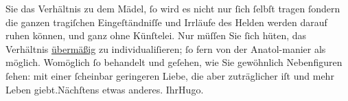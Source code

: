 \begin{ledgroupsized}[t]{13cm}
               Sie das Verhältnis
                    zu dem Mädel, ſo wird es nicht nur ſich ſelbſt tragen ſondern die ganzen
                    tragiſchen Eingeſtändniſſe und Irrläufe des Helden werden darauf ruhen können,
                    und ganz ohne Künſtelei. Nur müſſen Sie ſich hüten, das Verhältnis \uline{übermäßig} zu individualiſieren; ſo fern von der
                        Anatol-manier als möglich.\pend
           \pstart
           Womöglich ſo behandelt und geſehen, wie Sie gewöhnlich Nebenfiguren ſehen: mit
                    einer ſcheinbar geringeren Liebe, die aber zuträglicher iſt und mehr Leben
                        giebt.\hspace*{2.5em}Nächſtens etwas anderes.\pend
           \pstart Ihr\spacefill\mbox{Hugo.}\pend{}
         
         \endnumbering{}\end{ledgroupsized}  \newcommand{\dateiname}{L00564}\newcommand{\titel}{Hugo von Hofmannsthal an Arthur Schnitzler, 16. 7. [1896]}\newcommand{\editorInnen}{Martin Anton Müller und Gerd-Hermann Susen}
      
